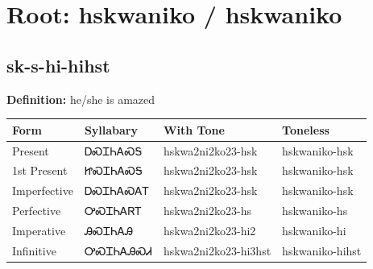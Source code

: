 \documentclass{article}%
\begin{document}
%
\normalsize%
\section*{Root: hskwaniko / hskwaniko}%
\subsection*{sk-s-hi-hihst}%
\textbf{Definition: }%
he/she is amazed%
\\[0.5em]%
\begin{tabular}{|l|l|l|l|}%
\hline%
\textbf{Form}&\textbf{Syllabary}&\textbf{With Tone}&\textbf{Toneless}\\%
\hline%
Present&ᎠᏍᏆᏂᎪᏍᎦ&hskwa2ni2ko23{-}hsk&hskwaniko{-}hsk\\%
1st Present&ᏥᏍᏆᏂᎪᏍᎦ&hskwa2ni2ko23{-}hsk&hskwaniko{-}hsk\\%
Imperfective&ᎠᏍᏆᏂᎪᏍᎪᎢ&hskwa2ni2ko23{-}hsk&hskwaniko{-}hsk\\%
Perfective&ᎤᏍᏆᏂᎪᏒᎢ&hskwa2ni2ko23{-}hs&hskwaniko{-}hs\\%
Imperative&ᎯᏍᏆᏂᎪᎯ&hskwa2ni2ko23{-}hi2&hskwaniko{-}hi\\%
Infinitive&ᎤᏍᏆᏂᎪᎯᏍᏗ&hskwa2ni2ko23{-}hi3hst&hskwaniko{-}hihst\\%
\hline%
\end{tabular}%
\\[1em]%
\end{document}
